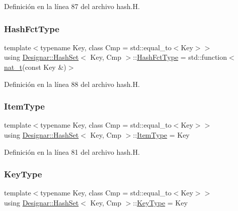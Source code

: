 Definición en la línea 87 del archivo hash.\+H.

\mbox{\label{class_designar_1_1_hash_set_a05d8d111665c25bc17290c01fa299398}} 
\subsubsection{\texorpdfstring{Hash\+Fct\+Type}{HashFctType}}
{\footnotesize\ttfamily template$<$typename Key, class Cmp = std\+::equal\+\_\+to$<$\+Key$>$$>$ \\
using \hyperlink{class_designar_1_1_hash_set}{Designar\+::\+Hash\+Set}$<$ Key, Cmp $>$\+::\hyperlink{class_designar_1_1_hash_set_a05d8d111665c25bc17290c01fa299398}{Hash\+Fct\+Type} =  std\+::function$<$\hyperlink{namespace_designar_aa72662848b9f4815e7bf31a7cf3e33d1}{nat\+\_\+t}(const Key \&)$>$}



Definición en la línea 88 del archivo hash.\+H.

\mbox{\label{class_designar_1_1_hash_set_af1cb023a84bf6c6f17867f99bbc523c5}} 
\subsubsection{\texorpdfstring{Item\+Type}{ItemType}}
{\footnotesize\ttfamily template$<$typename Key, class Cmp = std\+::equal\+\_\+to$<$\+Key$>$$>$ \\
using \hyperlink{class_designar_1_1_hash_set}{Designar\+::\+Hash\+Set}$<$ Key, Cmp $>$\+::\hyperlink{class_designar_1_1_hash_set_af1cb023a84bf6c6f17867f99bbc523c5}{Item\+Type} =  Key}



Definición en la línea 81 del archivo hash.\+H.

\mbox{\label{class_designar_1_1_hash_set_a4e23320d0b13915ce84186132ad4197a}} 
\subsubsection{\texorpdfstring{Key\+Type}{KeyType}}
{\footnotesize\ttfamily template$<$typename Key, class Cmp = std\+::equal\+\_\+to$<$\+Key$>$$>$ \\
using \hyperlink{class_designar_1_1_hash_set}{Designar\+::\+Hash\+Set}$<$ Key, Cmp $>$\+::\hyperlink{class_designar_1_1_hash_set_a4e23320d0b13915ce84186132ad4197a}{Key\+Type} =  Key}



